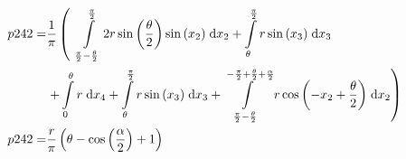 \begin{align}
    p242 =&\frac{1}{\pi} \left(\;\;\int\limits_{\frac{\pi}{2} - \frac{\theta}{2}}^{\frac{\pi}{2}}2 r \sin{\left (\frac{\theta}{2} \right )} \sin{\left (x_{2} \right )}\;\mathrm{d}x_{2}+\int\limits_{\theta}^{\frac{\pi}{2}}r \sin{\left (x_{3} \right )}\;\mathrm{d}x_{3}\right.\notag\\
 &\left.+\int\limits_{0}^{\theta}r\;\mathrm{d}x_{4}+\int\limits_{\theta}^{\frac{\pi}{2}}r \sin{\left (x_{3} \right )}\;\mathrm{d}x_{3}+\int\limits_{\frac{\pi}{2} - \frac{\theta}{2}}^{- \frac{\pi}{2} + \frac{\theta}{2} + \frac{\alpha}{2}}r \cos{\left (- x_{2} + \frac{\theta}{2} \right )}\;\mathrm{d}x_{2}\right)\label{p242Def}\\
    p242 =& \frac{r}{\pi} \left(\theta - \cos{\left (\frac{\alpha}{2} \right )} + 1\right)\label{p242Sln}
\end{align}